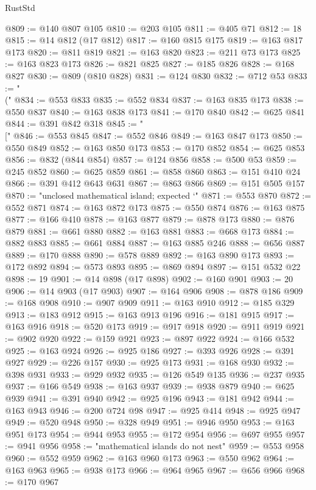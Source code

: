\begin{lexlean}{RustStd}
\begin{coremodule}
@809 := @140 @807 @105
@810 := @203 @105
@811 := @405 @71
@812 := 18
@815 := @14 @812 (@17 @812)
@817 := @160 @815 @175
@819 := @163 @817 @173
@820 := @811 @819
@821 := @163 @820
@823 := @211 @73 @173
@825 := @163 @823 @173
@826 := @821 @825
@827 := @185 @826
@828 := @168 @827
@830 := @809 (@810 @828)
@831 := @124 @830
@832 := @712 @53
@833 := "\\("
@834 := @553 @833
@835 := @552 @834
@837 := @163 @835 @173
@838 := @550 @837
@840 := @163 @838 @173
@841 := @170 @840
@842 := @625 @841
@844 := @391 @842 @318
@845 := "\\["
@846 := @553 @845
@847 := @552 @846
@849 := @163 @847 @173
@850 := @550 @849
@852 := @163 @850 @173
@853 := @170 @852
@854 := @625 @853
@856 := @832 (@844 @854)
@857 := @124 @856
@858 := @500 @53
@859 := @245 @852
@860 := @625 @859
@861 := @858 @860
@863 := @151 @410 @24
@866 := @391 @412 @643 @631
@867 := @863 @866
@869 := @151 @505 @157
@870 := "unclosed mathematical island; expected `"
@871 := @553 @870
@872 := @552 @871
@874 := @163 @872 @173
@875 := @550 @874
@876 := @163 @875
@877 := @166 @410
@878 := @163 @877
@879 := @878 @173
@880 := @876 @879
@881 := @661 @880
@882 := @163 @881
@883 := @668 @173
@884 := @882 @883
@885 := @661 @884
@887 := @163 @885 @246
@888 := @656 @887
@889 := @170 @888
@890 := @578 @889
@892 := @163 @890 @173
@893 := @172 @892
@894 := @573 @893
@895 := @869 @894
@897 := @151 @532 @22
@898 := 19
@901 := @14 @898 (@17 @898)
@902 := @160 @901
@903 := 20
@906 := @14 @903 (@17 @903)
@907 := @164 @906
@908 := @878 @186
@909 := @168 @908
@910 := @907 @909
@911 := @163 @910
@912 := @185 @329
@913 := @183 @912
@915 := @163 @913 @196
@916 := @181 @915
@917 := @163 @916
@918 := @520 @173
@919 := @917 @918
@920 := @911 @919
@921 := @902 @920
@922 := @159 @921
@923 := @897 @922
@924 := @166 @532
@925 := @163 @924
@926 := @925 @186
@927 := @393 @926
@928 := @391 @927
@929 := @226 @157
@930 := @925 @173
@931 := @168 @930
@932 := @398 @931
@933 := @929 @932
@935 := @126 @549 @135
@936 := @237 @935
@937 := @166 @549
@938 := @163 @937
@939 := @938 @879
@940 := @625 @939
@941 := @391 @940
@942 := @925 @196
@943 := @181 @942
@944 := @163 @943
@946 := @200 @724 @98
@947 := @925 @414
@948 := @925 @947
@949 := @520 @948
@950 := @328 @949
@951 := @946 @950
@953 := @163 @951 @173
@954 := @944 @953
@955 := @172 @954
@956 := @697 @955
@957 := @941 @956
@958 := "mathematical islands do not nest"
@959 := @553 @958
@960 := @552 @959
@962 := @163 @960 @173
@963 := @550 @962
@964 := @163 @963
@965 := @938 @173
@966 := @964 @965
@967 := @656 @966
@968 := @170 @967

\end{coremodule}
\end{lexlean}
